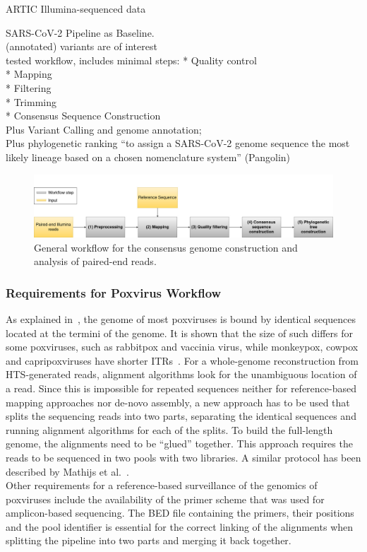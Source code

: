 ARTIC Illumina-sequenced data

\ac{SARS-CoV-2} Pipeline as Baseline. \\
(annotated) variants are of interest \\

tested workflow, includes minimal steps: 
* Quality control \\
* Mapping \\
* Filtering \\
* Trimming \\
* Consensus Sequence Construction \\

Plus Variant Calling and genome annotation; \\
Plus phylogenetic ranking ``to assign a \ac{SARS-CoV-2} genome sequence the most likely lineage based on a chosen nomenclature system'' (Pangolin)

\begin{figure}[H]
	\centering
	\includegraphics[width=1\textwidth]{media/general.jpg}
	\caption{General workflow for the consensus genome construction and analysis of paired-end reads.} 
	\label{fig:3-general-wf}
\end{figure}

\subsubsection{Requirements for Poxvirus Workflow}
As explained in~, the genome of most poxviruses is bound by identical sequences located at the termini of the genome. It is shown that the size of such differs for some poxviruses, such as rabbitpox and vaccinia virus, while monkeypox, cowpox and capripoxviruses have shorter \acp{ITR}~\cite{wittek1978inverted}. For a whole-genome reconstruction from \ac{HTS}-generated reads, alignment algorithms look for the unambiguous location of a read. Since this is impossible for repeated sequences neither for reference-based mapping approaches nor de-novo assembly, a new approach has to be used that splits the sequencing reads into two parts, separating the identical sequences and running alignment algorithms for each of the splits. To build the full-length genome, the alignments need to be ``glued'' together. This approach requires the reads to be sequenced in two pools with two libraries. A similar protocol has been described by Mathijs et al.~\cite{mathijs2022robust}. \\
Other requirements for a reference-based surveillance of the genomics of poxviruses include the availability of the primer scheme that was used for amplicon-based sequencing. The \ac{BED} file containing the primers, their positions and the pool identifier is essential for the correct linking of the alignments when splitting the pipeline into two parts and merging it back together.

